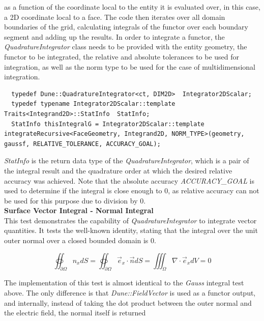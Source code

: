 \noindent
as a function of the coordinate local to the entity it is evaluated over, in this case, a 2D coordinate local to a face. The code then iterates over all domain boundaries of the grid, calculating integrals of the functor over each boundary segment and adding up the results. In order to integrate a functor, the \textit{QuadratureIntegrator} class needs to be provided with the entity geometry, the functor to be integrated, the relative and absolute tolerances to be used for integration, as well as the norm type to be used for the case of multidimensional integration. 
\begin{mybox}
\begin{lstlisting}
  typedef Dune::QuadratureIntegrator<ct, DIM2D>  Integrator2DScalar;
  typedef typename Integrator2DScalar::template Traits<Integrand2D>::StatInfo  StatInfo;	
  StatInfo thisIntegralG = Integrator2DScalar::template integrateRecursive<FaceGeometry, Integrand2D, NORM_TYPE>(geometry, gaussf, RELATIVE_TOLERANCE, ACCURACY_GOAL);
\end{lstlisting}
\end{mybox}

\noindent
\textit{StatInfo} is the return data type of the \textit{QuadratureIntegrator}, which is a pair of the integral result and the quadrature order at which the desired relative accuracy was achieved. Note that the absolute accuracy \textit{ACCURACY\_GOAL} is used to determine if the integral is close enough to 0, as relative accuracy can not be used for this purpose due to division by 0. \\



\noindent
\textbf{Surface Vector Integral - Normal Integral} \\
%
\noindent
This test demonstrates the capability of \textit{QuadratureIntegrator} to integrate vector quantities. It tests the well-known identity, stating that the integral over the unit outer normal over a closed bounded domain is 0.

\begin{equation}
	\oiint_{\partial \Omega} n_x dS = \oiint_{\partial \Omega} \vec{e}_x \cdot \vec{n} dS = \iiint_{\Omega} \nabla \cdot \vec{e}_x dV = 0
\end{equation}

\noindent
The implementation of this test is almost identical to the \textit{Gauss} integral test above. The only difference is that \textit{Dune::FieldVector} is used as a functor output, and internally, instead of taking the dot product between the outer normal and the electric field, the normal itself is returned


